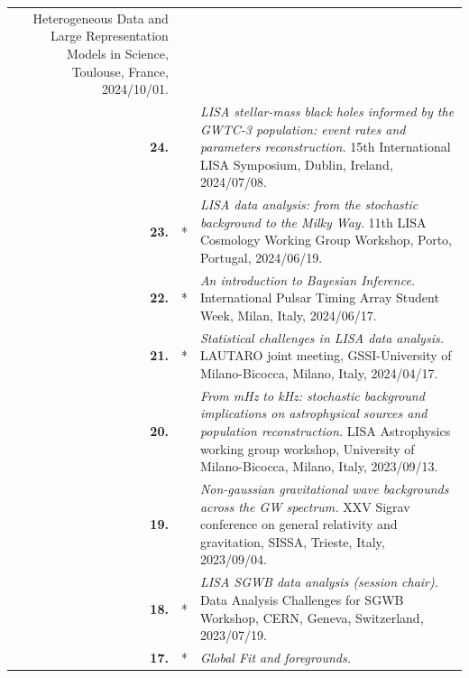 {\begin{longtable}{rp{0.3cm}p{15.8cm}}
\newline{}
Heterogeneous Data and Large Representation Models in Science, Toulouse, France, 2024/10/01.
\vspace{0.05cm}\\
%
\textbf{24.} &  & \textit{LISA stellar-mass black holes informed by the GWTC-3 population: event rates and parameters reconstruction.}
\newline{}
15th International LISA Symposium, Dublin, Ireland, 2024/07/08.
\vspace{0.05cm}\\
%
\textbf{23.} & * & \textit{LISA data analysis: from the stochastic background to the Milky Way.}
\newline{}
11th LISA Cosmology Working Group Workshop, Porto, Portugal, 2024/06/19.
\vspace{0.05cm}\\
%
\textbf{22.} & * & \textit{An introduction to Bayesian Inference.}
\newline{}
International Pulsar Timing Array Student Week, Milan, Italy, 2024/06/17.
\vspace{0.05cm}\\
%
\textbf{21.} & * & \textit{Statistical challenges in LISA data analysis.}
\newline{}
LAUTARO joint meeting, GSSI-University of Milano-Bicocca, Milano, Italy, 2024/04/17.
\vspace{0.05cm}\\
%
\textbf{20.} &  & \textit{From mHz to kHz: stochastic background implications on astrophysical sources and population reconstruction.}
\newline{}
LISA Astrophysics working group workshop, University of Milano-Bicocca, Milano, Italy, 2023/09/13.
\vspace{0.05cm}\\
%
\textbf{19.} &  & \textit{Non-gaussian gravitational wave backgrounds across the GW spectrum.}
\newline{}
XXV Sigrav conference on general relativity and gravitation, SISSA, Trieste, Italy, 2023/09/04.
\vspace{0.05cm}\\
%
\textbf{18.} & * & \textit{LISA SGWB data analysis (session chair).}
\newline{}
Data Analysis Challenges for SGWB Workshop, CERN, Geneva, Switzerland, 2023/07/19.
\vspace{0.05cm}\\
%
\textbf{17.} & * & \textit{Global Fit and foregrounds.}

\end{longtable}}
